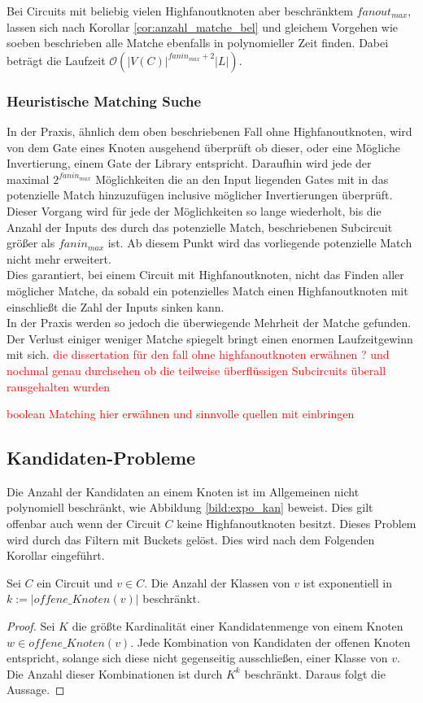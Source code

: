 \documentclass[11pt, a4paper, german]{article}
\begin{document}
Bei Circuits mit beliebig vielen Highfanoutknoten aber beschränktem $fanout_{max}$, lassen sich nach Korollar \ref{cor:anzahl_matche_bel} und gleichem Vorgehen wie soeben beschrieben alle Matche ebenfalls in polynomieller Zeit finden. Dabei beträgt die Laufzeit $\mathcal{O}(|V(C)|^{fanin_{max}+2}|L|)$.

\subsubsection{Heuristische Matching Suche}
In der Praxis, ähnlich dem oben beschriebenen Fall ohne Highfanoutknoten, wird von dem Gate eines Knoten ausgehend überprüft ob dieser, oder eine Mögliche Invertierung, einem Gate der Library entspricht. Daraufhin wird jede der maximal $2^{fanin_{max}}$ Möglichkeiten die an den Input liegenden Gates mit in das potenzielle Match hinzuzufügen inclusive möglicher Invertierungen überprüft. Dieser Vorgang wird für jede der Möglichkeiten so lange wiederholt, bis die Anzahl der Inputs des durch das potenzielle Match,  beschriebenen Subcircuit größer als $fanin_{max}$ ist. Ab diesem Punkt wird das vorliegende potenzielle Match nicht mehr erweitert. \\
Dies garantiert, bei einem Circuit mit Highfanoutknoten, nicht das Finden aller möglicher Matche, da sobald ein potenzielles Match einen Highfanoutknoten mit einschließt die Zahl der Inputs sinken kann. \\
In der Praxis werden so jedoch die überwiegende Mehrheit der Matche gefunden. Der Verlust einiger weniger Matche spiegelt bringt einen enormen Laufzeitgewinn mit sich.
\textcolor{red}{die dissertation für den fall ohne highfanoutknoten erwähnen ? und nochmal genau durchsehen ob die teilweise überflüssigen Subcircuits überall rausgehalten wurden }

\textcolor{red}{boolean Matching hier erwähnen und sinnvolle quellen mit einbringen}

\subsection{Kandidaten-Probleme}
\label{subsec:kand_prob}
Die Anzahl der Kandidaten an einem Knoten ist im Allgemeinen nicht polynomiell beschränkt, wie Abbildung \ref{bild:expo_kan} beweist. Dies gilt offenbar auch wenn der Circuit $C$ keine Highfanoutknoten besitzt. Dieses Problem wird durch das Filtern mit Buckets gelöst. Dies wird nach dem Folgenden Korollar eingeführt. 
\begin{cor}
Sei $C$ ein Circuit und $v \in C$. Die Anzahl der Klassen von $v$ ist exponentiell in $k:= |offene\_Knoten(v)|$ beschränkt.
\end{cor}
\begin{proof}
Sei $K$ die größte Kardinalität einer Kandidatenmenge von einem Knoten $w\in offene\_Knoten(v)$. Jede Kombination von Kandidaten der offenen Knoten entspricht, solange sich diese nicht gegenseitig ausschließen, einer Klasse von $v$. Die Anzahl dieser Kombinationen ist durch $K^k$ beschränkt. Daraus folgt die Aussage.
\end{proof}
\end{document}
